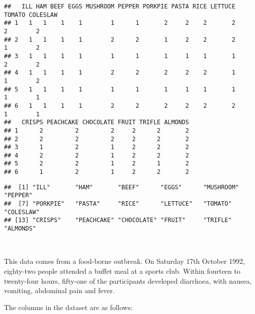 \documentclass[
  12pt,
  a4paper]{book}
\begin{document}
\begin{verbatim}
##   ILL HAM BEEF EGGS MUSHROOM PEPPER PORKPIE PASTA RICE LETTUCE TOMATO COLESLAW
## 1   1   1    1    1        1      1       2     2    2       2      2        2
## 2   1   1    1    1        2      2       1     2    2       2      1        2
## 3   1   1    1    1        1      1       1     1    1       1      2        2
## 4   1   1    1    1        2      2       2     2    2       1      1        2
## 5   1   1    1    1        1      1       1     1    1       1      1        1
## 6   1   1    1    1        2      2       2     2    2       2      1        1
##   CRISPS PEACHCAKE CHOCOLATE FRUIT TRIFLE ALMONDS
## 1      2         2         2     2      2       2
## 2      2         2         2     2      2       2
## 3      1         2         1     2      2       2
## 4      2         2         1     2      2       2
## 5      2         2         1     2      1       2
## 6      1         2         1     2      2       2
\end{verbatim}

\begin{verbatim}
##  [1] "ILL"       "HAM"       "BEEF"      "EGGS"      "MUSHROOM"  "PEPPER"   
##  [7] "PORKPIE"   "PASTA"     "RICE"      "LETTUCE"   "TOMATO"    "COLESLAW" 
## [13] "CRISPS"    "PEACHCAKE" "CHOCOLATE" "FRUIT"     "TRIFLE"    "ALMONDS"
\end{verbatim}

~

This data comes from a food-borne outbreak. On Saturday 17th October 1992, eighty-two people attended a buffet meal at a sports club. Within fourteen to twenty-four hours, fifty-one of the participants developed diarrhoea, with nausea, vomiting, abdominal pain and fever.

The columns in the dataset are as follows:
\end{document}
